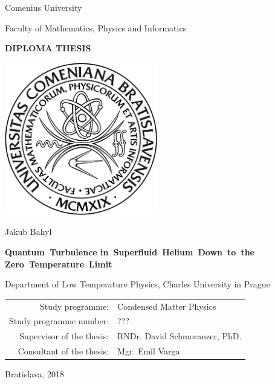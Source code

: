 \begin{center}
	\large\sf
	Comenius University

	Faculty of Mathematics, Physics and Informatics
	
	\bigskip

	{
		\Large \bfseries \sffamily 
		DIPLOMA THESIS
	}
	
	\vspace*{10mm}

	\includegraphics[width=0.5\textwidth]{graphics/fmfi_logo.jpg} 

	\vfill
	\vspace*{5mm}

	{
		\LARGE\sf 
		Jakub Bahyl
	}

	\vspace*{5mm}

	{
		\LARGE \bfseries \sffamily
		\mbox{Quantum Turbulence}
		\mbox{in Superfluid Helium Down to the}
		\mbox{Zero Temperature Limit}
	}

	\vfill

	Department of Low Temperature Physics, Charles University in Prague

	\vfill

	\begin{tabular}{rl}

	Study programme: & Condensed Matter Physics \\
	\noalign{\vspace{1mm}}
	Study programme number: & ??? \\
	\noalign{\vspace{1mm}}
	Supervisor of the thesis: & RNDr. David Schmoranzer, PhD. \\
	\noalign{\vspace{1mm}}
	Consultant of the thesis: & Mgr. Emil Varga \\

	\end{tabular}

	\vfill

	{
		\Large\sf Bratislava, 2018
	}

\end{center}

\newpage